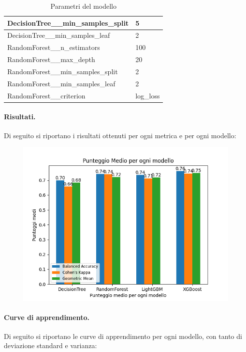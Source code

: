 \begin{table}[H]
\begin{tabular}{|l|l|}
            DecisionTree\_\_min\_samples\_split & 5               \\ \hline
            DecisionTree\_\_min\_samples\_leaf & 2               \\ \hline
            RandomForest\_\_n\_estimators     & 100             \\ \hline
            RandomForest\_\_max\_depth        & 20              \\ \hline
            RandomForest\_\_min\_samples\_split & 2               \\ \hline
            RandomForest\_\_min\_samples\_leaf & 2               \\ \hline
            RandomForest\_\_criterion         & log\_loss       \\ \hline
            \end{tabular}
            \caption{Parametri del modello}
            
            \end{table}
\paragraph{Risultati.} Di seguito si riportano i risultati ottenuti per ogni metrica e per ogni modello:
\begin{figure}[H]
    \centering
    \includegraphics[scale=0.5]{img/normal_metrics.png}
\end{figure}


\paragraph{Curve di apprendimento.} Di seguito si riportano le curve di apprendimento per ogni modello, con tanto di deviazione standard e varianza:

